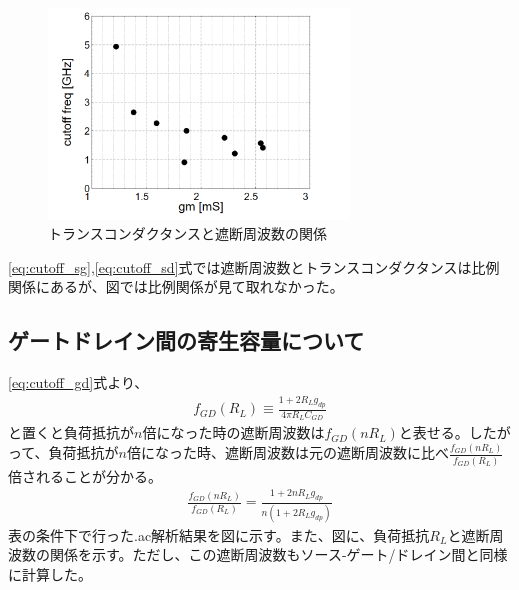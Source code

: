 \documentclass[twocolumn]{jsarticle}
\begin{document}
    \begin{figure}[!h]
        \begin{center}
            \includegraphics*[width=80mm]{graphes/bitmap/gmp_cutoff.PNG}
            \caption{トランスコンダクタンスと遮断周波数の関係}
            \label{fig:gm_cutoff}
        \end{center}
    \end{figure}

    \newpage

    \eqref{eq:cutoff_sg},\eqref{eq:cutoff_sd}式では遮断周波数とトランスコンダクタンスは比例関係にあるが、図では比例関係が見て取れなかった。    

\subsection{ゲートドレイン間の寄生容量について}
    \eqref{eq:cutoff_gd}式より、
    \begin{align*}
        f_{GD}(R_{L})\equiv\frac{1+2R_{L}g_{dp}}{4\pi R_{L}C_{GD}}
    \end{align*}
    と置くと負荷抵抗が$n$倍になった時の遮断周波数は$f_{GD}(nR_{L})$と表せる。したがって、負荷抵抗が$n$倍になった時、遮断周波数は元の遮断周波数に比べ$\frac{f_{GD}(nR_{L})}{f_{GD}(R_{L})}$倍されることが分かる。
    \begin{align}
        \frac{f_{GD}(nR_{L})}{f_{GD}(R_{L})}=\frac{1+2nR_{L}g_{dp}}{n(1+2R_{L}g_{dp})} 
    \end{align}
    表の条件下で行った.ac解析結果を図に示す。また、図に、負荷抵抗$R_{L}$と遮断周波数の関係を示す。ただし、この遮断周波数もソース-ゲート/ドレイン間と同様に計算した。
\end{document}
